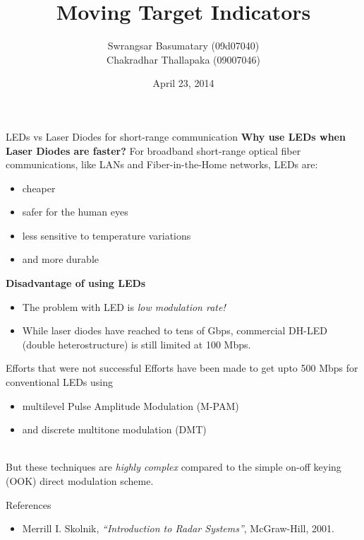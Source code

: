 \documentclass[mathserif]{beamer}
\title{Moving Target Indicators}
\author{Swrangsar Basumatary (09d07040) \\ Chakradhar Thallapaka (09007046)}
\institute{Department of Electrical Engineering \\ IIT Bombay, Powai}
\date{April 23, 2014}
\begin{document}
    \frame{\titlepage}
    
    \begin{frame}{LEDs vs Laser Diodes for short-range communication}
\pause
\textbf{Why use LEDs when Laser Diodes are faster?}
            \pause For broadband short-range optical fiber communications, like
LANs and Fiber-in-the-Home networks, LEDs are:
            \pause
            \begin{itemize}
                \item cheaper
                \item safer for the human eyes
                \item less sensitive to temperature variations
                \item and more durable
            \end{itemize}
  
        \pause
        \textbf{Disadvantage of using LEDs}
            \begin{itemize}
                \pause \item The problem with LED is \pause \emph{low modulation rate!}\\
                \pause \item While laser diodes have reached to tens of Gbps, \pause
                commercial DH-LED (double heterostructure) is still limited at 100 Mbps.
            \end{itemize}
        
    \end{frame}
    
    \begin{frame}{Efforts that were not successful}
        \pause
        Efforts have been made to get upto 500 Mbps for conventional LEDs using
        \begin{itemize}
            \pause \item multilevel Pulse Amplitude Modulation (M-PAM)
            \pause \item and discrete multitone modulation (DMT) \\~\\
        \end{itemize}
        
        \pause But these techniques are \emph{highly complex} compared to the simple on-off keying (OOK) direct modulation scheme.
    \end{frame}
    
    
    
 
    
    \begin{frame}{References}
        \pause
        \begin{itemize}
                 \item Merrill I. Skolnik, \emph{``Introduction to Radar Systems''}, McGraw-Hill, 2001.
        \end{itemize}
    \end{frame}
    
    
\end{document}
